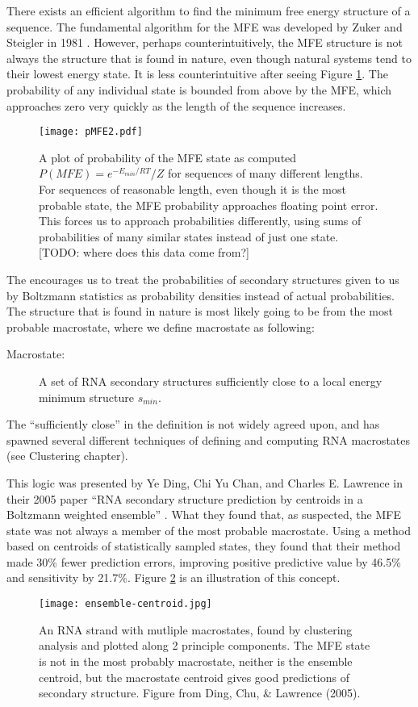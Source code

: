 There exists an efficient algorithm to find the minimum free energy
structure of a sequence. The fundamental algorithm for the MFE was
developed by Zuker and Steigler in 1981
\cite{zuker1981optimal}. However, perhaps counterintuitively, the MFE
structure is not always the structure that is found in nature, even
though natural systems tend to their lowest energy state. It is less
counterintuitive after seeing Figure \ref{fig:probMFE}. The
probability of any individual state is bounded from above by the MFE,
which approaches zero very quickly as the length of the sequence
increases.
\begin{figure}[t]
\centering
\texttt{[image: pMFE2.pdf]}
\caption{A plot of probability of the MFE state as computed $P(MFE) =
  e^{-E_{min}/RT}/Z$ for sequences of many different lengths. For
  sequences of reasonable length, even though it is the most probable
  state, the MFE probability approaches floating point error. This
  forces us to approach probabilities differently, using sums of
  probabilities of many similar states instead of just one state. [TODO: where
    does this data come from?]}
\label{fig:probMFE}
\end{figure}
The encourages us to treat the probabilities of secondary structures
given to us by Boltzmann statistics as probability densities instead
of actual probabilities. The structure that is found in nature is most
likely going to be from the most probable macrostate, where we define
macrostate as following:
\begin{description}
\item[Macrostate:] A set of RNA secondary structures sufficiently
  close to a local energy minimum structure $s_{min}$. 
\end{description}
The ``sufficiently close'' in the definition is not widely agreed
upon, and has spawned several different techniques of defining and
computing RNA macrostates (see Clustering chapter).

This logic was presented by Ye Ding, Chi Yu Chan, and Charles
E. Lawrence in their 2005 paper ``RNA secondary structure prediction
by centroids in a Boltzmann weighted ensemble''
\cite{ding2005rna}. What they found that, as suspected, the MFE state
was not always a member of the most probable macrostate. Using a
method based on centroids of statistically sampled states, they found
that their method made 30\% fewer prediction errors, improving
positive predictive value by 46.5\% and sensitivity by 21.7\%. Figure
\ref{fig:centroidFig} is an illustration of this concept.
\begin{figure}[t]
\centering
\texttt{[image: ensemble-centroid.jpg]}
\caption{An RNA strand with mutliple macrostates, found by clustering
  analysis and plotted along 2 principle components. The MFE state is
  not in the most probably macrostate, neither is the ensemble
  centroid, but the macrostate centroid gives good predictions of
  secondary structure. Figure from Ding, Chu, \& Lawrence (2005).}
\label{fig:centroidFig}
\end{figure}

